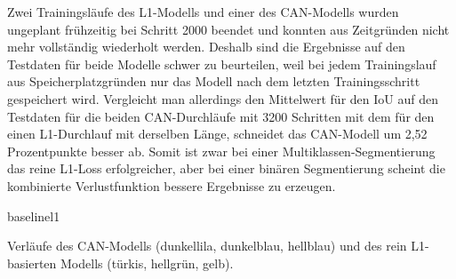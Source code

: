 Zwei Trainingsläufe des L1-Modells und einer des CAN-Modells wurden ungeplant frühzeitig bei Schritt 2000 beendet und konnten aus Zeitgründen nicht mehr vollständig wiederholt werden.
Deshalb sind die Ergebnisse auf den Testdaten für beide Modelle schwer zu beurteilen, weil bei jedem Trainingslauf aus Speicherplatzgründen nur das Modell nach dem letzten Trainingsschritt gespeichert wird.
Vergleicht man allerdings den Mittelwert für den IoU auf den Testdaten für die beiden CAN-Durchläufe mit 3200 Schritten mit dem für den einen L1-Durchlauf mit derselben Länge, schneidet das CAN-Modell um 2,52 Prozentpunkte besser ab.
Somit ist zwar bei einer Multiklassen-Segmentierung das reine L1-Loss erfolgreicher, aber bei einer binären Segmentierung scheint die kombinierte Verlustfunktion bessere Ergebnisse zu erzeugen.

\begin{losses}{baselinel1}
	\caption[Verläufe des CAN-Modells und des rein L1-basierten Modells]{Verläufe des CAN-Modells (dunkellila, dunkelblau, hellblau) und des rein L1-basierten Modells (türkis, hellgrün, gelb).}
	\label{fig:lossbaselinel1}
\end{losses}
